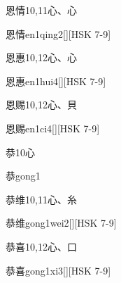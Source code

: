 \begin{Entry}{恩情}{10,11}{⼼、⼼}
  \begin{Phonetics}{恩情}{en1qing2}[][HSK 7-9]
  \end{Phonetics}
\end{Entry}

\begin{Entry}{恩惠}{10,12}{⼼、⼼}
  \begin{Phonetics}{恩惠}{en1hui4}[][HSK 7-9]
  \end{Phonetics}
\end{Entry}

\begin{Entry}{恩赐}{10,12}{⼼、⾙}
  \begin{Phonetics}{恩赐}{en1ci4}[][HSK 7-9]
  \end{Phonetics}
\end{Entry}

\begin{Entry}{恭}{10}{⼼}
  \begin{Phonetics}{恭}{gong1}
  \end{Phonetics}
\end{Entry}

\begin{Entry}{恭维}{10,11}{⼼、⽷}
  \begin{Phonetics}{恭维}{gong1wei2}[][HSK 7-9]
  \end{Phonetics}
\end{Entry}

\begin{Entry}{恭喜}{10,12}{⼼、⼝}
  \begin{Phonetics}{恭喜}{gong1xi3}[][HSK 7-9]
  \end{Phonetics}
\end{Entry}

